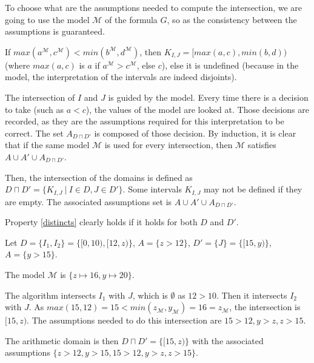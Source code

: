 To choose what are the assumptions needed to compute the intersection, we are going to use the model
$\mathcal{M}$
of the formula $G$, so as the consistency between the assumptions is guaranteed.

If
$max(a^\mathcal{M}, c^\mathcal{M}) < min(b^\mathcal{M}, d^\mathcal{M})$,
then $K_{I, J} = [max(a, c), min(b, d))$ (where $max(a, c)$ is $a$
if $a^\mathcal{M} > c^\mathcal{M}$, else $c$), else it is undefined
(because in the model, the interpretation of the intervals are indeed
disjoints).

The intersection of $I$ and $J$ is guided by the model.
Every time there is a decision to take (such as $a < c$), the values
of the model are looked at. Those decisions are recorded, as they
are the assumptions required for this interpretation to be correct. The
set $A_{D\sqcap D'}$ is composed of those decision. By induction, it is clear that if the same model
$\mathcal{M}$ is used for every intersection, then $\mathcal{M}$ satisfies $A \cup A' \cup A_{D \sqcap D'}$.


Then, the intersection of the domains is defined as
$D \sqcap D' = \{ K_{I, J} \ |\ I \in D, J \in D' \}$. Some intervals $K_{I, J}$ may not be defined
if they are empty. The associated assumptions set is $A \cup A' \cup A_{D \sqcap D'}$.

Property \ref{distincts} clearly holds if it holds for both $D$ and $D'$.

\begin{example}

Let $D = \{ I_1, I_2\} =  \{[0, 10), [12, z)\}$, $A = \{ z > 12 \}$, $D' = \{J\}= \{[15, y)\}$, $A =
\{ y > 15 \}$.

The model $\mathcal{M}$ is $\{ z \mapsto 16, y \mapsto 20 \}$.

The algorithm intersects $I_1$ with $J$,  which is $\emptyset$ as $12 > 10$. Then it intersects
$I_2$ with $J$. As $max(15, 12) = 15 < min(z_\mathcal{M}, y_\mathcal{M}) = 16 = z_\mathcal{M}$, the
intersection is $[15, z)$. The assumptions needed to do this intersection are $15 > 12, y > z, z >
15$.

The arithmetic domain is then $D\sqcap D' = \{[15, z)\}$ with the associated assumptions $\{z > 12,
y > 15, 15 > 12, y > z, z > 15\}$.

\end{example}

